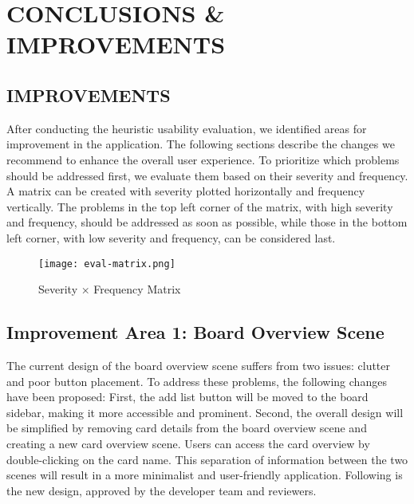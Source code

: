 \graphicspath{{huereport/content/images/}}

\section{CONCLUSIONS \& IMPROVEMENTS}
\subsection{IMPROVEMENTS}
After conducting the heuristic usability evaluation, we identified areas for improvement in the application. The following sections describe the changes we recommend to enhance the overall user experience.
\newline
\newline
\indent To prioritize which problems should be addressed first, we evaluate them based on their severity and frequency. A matrix can be created with severity plotted horizontally and frequency vertically. The problems in the top left corner of the matrix, with high severity and frequency, should be addressed as soon as possible, while those in the bottom left corner, with low severity and frequency, can be considered last. 
\newline
\begin{figure}[H]
    \centering
    \texttt{[image: eval-matrix.png]}
    \caption{Severity × Frequency Matrix}
    \label{fig:matrix}
\end{figure}
\subsection*{Improvement Area 1: Board Overview Scene}
\indent The current design of the board overview scene suffers from two issues: clutter and poor button placement.
\newline\indent
To address these problems, the following changes have been proposed:
\newline\indent First, the add list button will be moved to the board sidebar, making it more accessible and prominent.
\newline 
\indent Second, the overall design will be simplified by removing card details from the board overview scene and creating a new card overview scene. Users can access the card overview by double-clicking on the card name. This separation of information between the two scenes will result in a more minimalist and user-friendly application. Following is the new design, approved by the developer team and reviewers.

